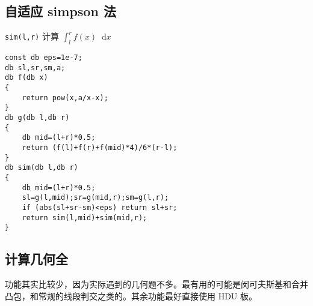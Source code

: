 \documentclass[12pt]{ctexart}
\newcommand*{\dif}{\mathop{}\!\mathrm{d}}
\begin{document}
\subsection{自适应 simpson 法}

\verb|sim(l,r)| 计算 $\int_l^r f(x)\dif x$

\begin{lstlisting}
const db eps=1e-7;
db sl,sr,sm,a;
db f(db x)
{
	return pow(x,a/x-x);
}
db g(db l,db r)
{
	db mid=(l+r)*0.5;
	return (f(l)+f(r)+f(mid)*4)/6*(r-l);
}
db sim(db l,db r)
{
	db mid=(l+r)*0.5;
	sl=g(l,mid);sr=g(mid,r);sm=g(l,r);
	if (abs(sl+sr-sm)<eps) return sl+sr;
	return sim(l,mid)+sim(mid,r);
}
\end{lstlisting}

\subsection{计算几何全}

功能其实比较少，因为实际遇到的几何题不多。最有用的可能是闵可夫斯基和合并凸包，和常规的线段判交之类的。其余功能最好直接使用 HDU 板。
\end{document}
